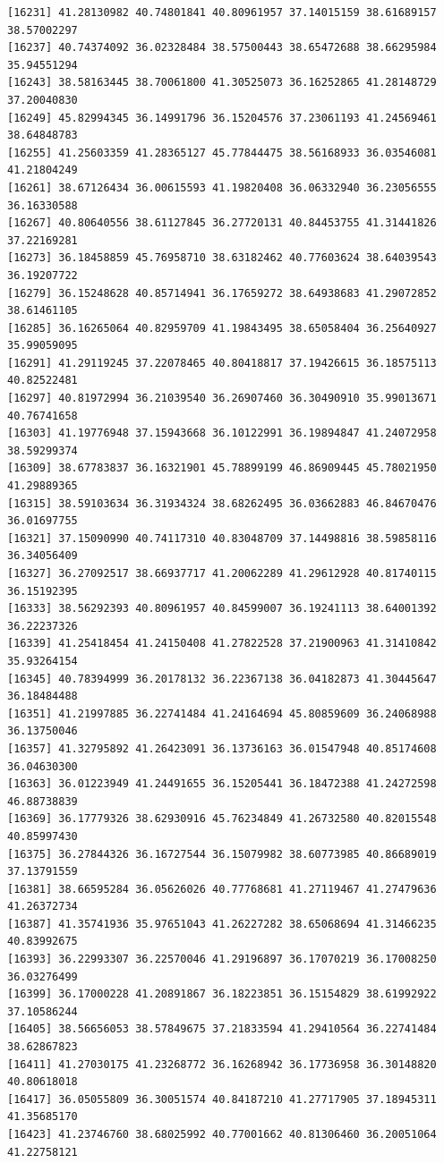 \documentclass[
  letterpaper,
  DIV=11,
  numbers=noendperiod]{scrartcl}
\begin{document}
\begin{verbatim}
[16231] 41.28130982 40.74801841 40.80961957 37.14015159 38.61689157 38.57002297
[16237] 40.74374092 36.02328484 38.57500443 38.65472688 38.66295984 35.94551294
[16243] 38.58163445 38.70061800 41.30525073 36.16252865 41.28148729 37.20040830
[16249] 45.82994345 36.14991796 36.15204576 37.23061193 41.24569461 38.64848783
[16255] 41.25603359 41.28365127 45.77844475 38.56168933 36.03546081 41.21804249
[16261] 38.67126434 36.00615593 41.19820408 36.06332940 36.23056555 36.16330588
[16267] 40.80640556 38.61127845 36.27720131 40.84453755 41.31441826 37.22169281
[16273] 36.18458859 45.76958710 38.63182462 40.77603624 38.64039543 36.19207722
[16279] 36.15248628 40.85714941 36.17659272 38.64938683 41.29072852 38.61461105
[16285] 36.16265064 40.82959709 41.19843495 38.65058404 36.25640927 35.99059095
[16291] 41.29119245 37.22078465 40.80418817 37.19426615 36.18575113 40.82522481
[16297] 40.81972994 36.21039540 36.26907460 36.30490910 35.99013671 40.76741658
[16303] 41.19776948 37.15943668 36.10122991 36.19894847 41.24072958 38.59299374
[16309] 38.67783837 36.16321901 45.78899199 46.86909445 45.78021950 41.29889365
[16315] 38.59103634 36.31934324 38.68262495 36.03662883 46.84670476 36.01697755
[16321] 37.15090990 40.74117310 40.83048709 37.14498816 38.59858116 36.34056409
[16327] 36.27092517 38.66937717 41.20062289 41.29612928 40.81740115 36.15192395
[16333] 38.56292393 40.80961957 40.84599007 36.19241113 38.64001392 36.22237326
[16339] 41.25418454 41.24150408 41.27822528 37.21900963 41.31410842 35.93264154
[16345] 40.78394999 36.20178132 36.22367138 36.04182873 41.30445647 36.18484488
[16351] 41.21997885 36.22741484 41.24164694 45.80859609 36.24068988 36.13750046
[16357] 41.32795892 41.26423091 36.13736163 36.01547948 40.85174608 36.04630300
[16363] 36.01223949 41.24491655 36.15205441 36.18472388 41.24272598 46.88738839
[16369] 36.17779326 38.62930916 45.76234849 41.26732580 40.82015548 40.85997430
[16375] 36.27844326 36.16727544 36.15079982 38.60773985 40.86689019 37.13791559
[16381] 38.66595284 36.05626026 40.77768681 41.27119467 41.27479636 41.26372734
[16387] 41.35741936 35.97651043 41.26227282 38.65068694 41.31466235 40.83992675
[16393] 36.22993307 36.22570046 41.29196897 36.17070219 36.17008250 36.03276499
[16399] 36.17000228 41.20891867 36.18223851 36.15154829 38.61992922 37.10586244
[16405] 38.56656053 38.57849675 37.21833594 41.29410564 36.22741484 38.62867823
[16411] 41.27030175 41.23268772 36.16268942 36.17736958 36.30148820 40.80618018
[16417] 36.05055809 36.30051574 40.84187210 41.27717905 37.18945311 41.35685170
[16423] 41.23746760 38.68025992 40.77001662 40.81306460 36.20051064 41.22758121

\end{verbatim}
\end{document}
